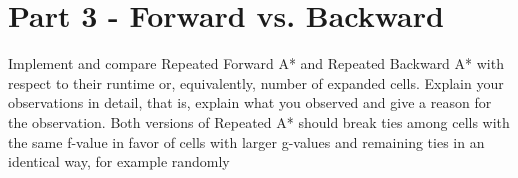 \documentclass{article}
\begin{document}

\section{Part 3 - Forward vs. Backward}

Implement and compare Repeated Forward A* and Repeated Backward A*
with respect to their runtime or, equivalently, number of expanded cells. Explain your observations in detail, that is, explain
what you observed and give a reason for the observation. Both versions of Repeated A* should break ties among cells with
the same f-value in favor of cells with larger g-values and remaining ties in an identical way, for example randomly
\newline

\end{document}
